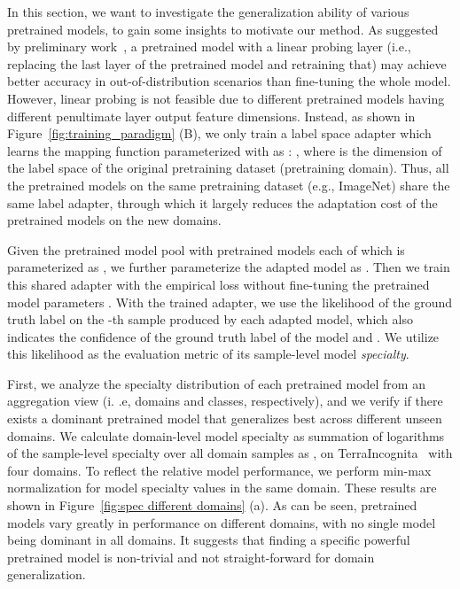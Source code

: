 \documentclass{article}
\begin{document}
In this section, we want to investigate the generalization ability of various pretrained models, to gain some insights to motivate our method.
As suggested by preliminary work~\citep{kumar2021fine}, a pretrained model with a linear probing layer (i.e., replacing the last layer of the pretrained model and retraining that) may achieve better accuracy in out-of-distribution scenarios than fine-tuning the whole model.
However, linear probing is not feasible
due to different pretrained models having different penultimate layer output feature dimensions. 
Instead, as shown in Figure~\ref{fig:training_paradigm} (B), we only train a label space adapter which learns the mapping function parameterized with  as : , where  is 
the dimension of the label space
of the original pretraining dataset (pretraining domain).
Thus, all the pretrained models on the same pretraining dataset (e.g., ImageNet) share the same label adapter, through which it largely reduces the adaptation cost of the pretrained models on the new domains.

Given the pretrained model pool  with  pretrained models each of which is parameterized as ,
we further parameterize the adapted model  as .
Then we train this shared adapter  with the empirical loss  without fine-tuning the pretrained model parameters .
With the trained adapter, we use the likelihood of the ground truth label  on the -th sample produced by each adapted model, which also indicates 
the confidence of the ground truth label  of the model and .
We utilize this likelihood as the evaluation metric of its sample-level model \textit{specialty}.

First, we analyze the specialty distribution of each pretrained model from an aggregation view (i. .e, domains and classes, respectively), and we verify if there exists a dominant pretrained model that generalizes best across different unseen domains.
We calculate domain-level model specialty as summation of logarithms of the sample-level specialty over all domain samples as , on TerraIncognita~\citep{beery2018recognition} with four domains.
To reflect the relative model performance, we perform min-max normalization for model specialty values in the same domain.
These results are shown in Figure~\ref{fig:spec different domains} (a).
As can be seen, pretrained models vary greatly in performance on different domains, with no single model being dominant in all domains.
It suggests that finding a specific powerful pretrained model is non-trivial and not straight-forward for domain generalization.
\end{document}
